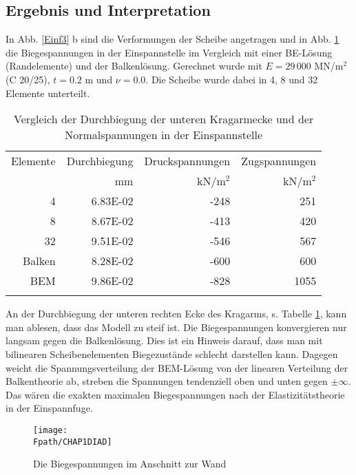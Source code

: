 {\textcolor{sectionTitleBlue}{\subsection{Ergebnis und Interpretation}}
In Abb. \ref{Einf3} b sind die Verformungen der Scheibe angetragen und in Abb. \ref{Chap1Dia} die Biegespannungen in der Einspannstelle im Vergleich mit einer BE-L\"{o}sung (Randelemente) und der Balkenl\"{o}sung. Gerechnet wurde mit $E = 29 \,000$ MN/m$^2$ (C 20/25), $t = 0.2$ m und $\nu = 0.0$. Die Scheibe wurde dabei in 4, 8 und 32 Elemente unterteilt.
\begin{table}[tbp] \centering
\caption{ Vergleich der Durchbiegung der unteren Kragarmecke und der Normalspannungen in
der Einspannstelle} \label{TabVergleich1}
\begin{tabular}{rrrr}
\noalign{\hrule\smallskip}
  Elemente & Durchbiegung  & Druckspannungen & Zugspannungen \\
           &         mm &     kN/m$^2$  &      kN/m$^2$  \\ \noalign{\hrule\smallskip}
         4 &   6.83E-02 &       -248 &        251 \\
         8 &   8.67E-02 &       -413 &        420 \\
        32 &   9.51E-02 &       -546 &        567 \\
    Balken &   8.28E-02 &       -600 &        600 \\
       BEM &   9.86E-02 &       -828 &       1055 \\ \noalign{\hrule\smallskip}
\end{tabular}
\end{table}

An der Durchbiegung der unteren rechten Ecke des Kragarms, s. Tabelle \ref{TabVergleich1}, kann man ablesen, dass das Modell zu steif ist. Die Biegespannungen konvergieren nur langsam gegen die Balkenl\"{o}sung. Dies ist ein Hinweis darauf, dass man mit bilinearen Scheibenelementen Biegezust\"{a}nde schlecht darstellen kann. Dagegen weicht die Spannungsverteilung der BEM-L\"{o}sung von der linearen Verteilung der Balkentheorie ab, streben die Spannungen tendenziell oben und unten gegen $\pm \infty$. Das w\"{a}ren die exakten maximalen Biegespannungen nach der Elastizit\"{a}tstheorie in der Einspannfuge.
\begin{figure}[tbp] \centering
\if {} \sidecaption \fi
\texttt{[image: \\Fpath/CHAP1DIAD]}
\caption{Die Biegespannungen im Anschnitt zur Wand} \label{Chap1Dia}
\end{figure}%

}
